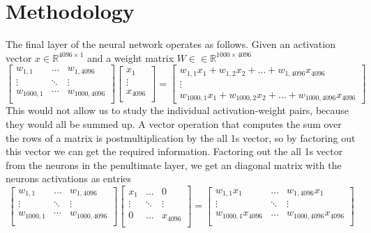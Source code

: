 \documentclass{article}
\begin{document}
    \section*{Methodology}
        The final layer of the neural network operates as follows. Given an activation vector $x \in \mathbb{R}^{4096 \times 1}$ and a weight matrix $W \in \in \mathbb{R}^{1000 \times 4096}$ \\
        \[
            \begin{bmatrix}
                w_{1,1} & \dots & w_{1,4096} \\
                \vdots & \ddots & \vdots \\
                w_{1000, 1} & \cdots & w_{1000, 4096} \\
            \end{bmatrix}
            \begin{bmatrix}
                x_1 \\
                \vdots \\
                x_{4096} \\
            \end{bmatrix}
            = 
            \begin{bmatrix}
                w_{1,1}x_1 + w_{1, 2}x_2 + \dots + w_{1, 4096}x_{4096} \\
                \vdots \\
                w_{1000,1}x_1 + w_{1000, 2}x_2 + \dots + w_{1000, 4096}x_{4096}
            \end{bmatrix}
        \]
        This would not allow us to study the individual activation-weight pairs, because they would all be summed up. A vector operation that computes the sum over the rows of a matrix is postmultiplication by the all 1s vector, so by factoring out this vector we can get the required information. Factoring out the all 1s vector from the neurons in the penultimate layer, we get an diagonal matrix with the neurons activations as entries \\
        \[
            \begin{bmatrix}
                w_{1,1} & \dots & w_{1,4096} \\
                \vdots & \ddots & \vdots \\
                w_{1000, 1} & \cdots & w_{1000, 4096} \\
            \end{bmatrix}
            \begin{bmatrix}
                x_1  & \dots & 0 \\
                \vdots & \ddots & \vdots \\
                0 & \dots & x_{4096} \\
            \end{bmatrix}
            = 
            \begin{bmatrix}
                w_{1,1}x_1  & \dots & w_{1,4096}x_1 \\
                \vdots & \ddots & \vdots \\
                w_{1000, 1}x_{4096} & \dots & w_{1000, 4096}x_{4096} \\
            \end{bmatrix}
        \]
        
\end{document}
